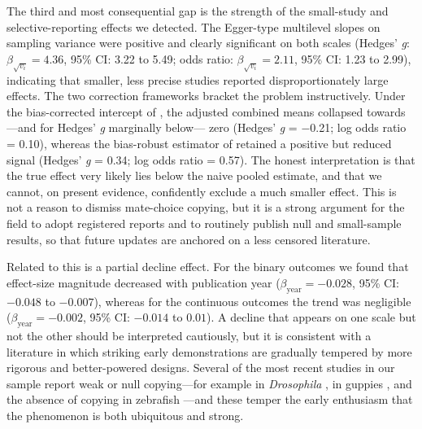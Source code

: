 The third and most consequential gap is the strength of the small-study and
selective-reporting effects we detected. The Egger-type multilevel slopes on
sampling variance were positive and clearly significant on both scales
(Hedges' \textit{g}: $\beta_{\sqrt{v_i}} = 4.36$, 95\% CI: 3.22 to 5.49; odds
ratio: $\beta_{\sqrt{v_i}} = 2.11$, 95\% CI: 1.23 to 2.99), indicating that
smaller, less precise studies reported disproportionately large effects. The two
correction frameworks bracket the problem instructively. Under the bias-corrected
intercept of \textcite{nakagawaMethodsTestingPublication2022}, the adjusted
combined means collapsed towards---and for Hedges' \textit{g} marginally below---
zero (Hedges' \textit{g} = $-$0.21; log odds ratio = 0.10), whereas the
bias-robust estimator of \textcite{yangRobustPointVariance2024} retained a
positive but reduced signal (Hedges' \textit{g} = 0.34; log odds ratio = 0.57).
The honest interpretation is that the true effect very likely lies below the
naive pooled estimate, and that we cannot, on present evidence, confidently
exclude a much smaller effect. This is not a reason to dismiss mate-choice
copying, but it is a strong argument for the field to adopt registered reports
and to routinely publish null and small-sample results, so that future updates
are anchored on a less censored literature.

Related to this is a partial decline effect. For the binary outcomes we found
that effect-size magnitude decreased with publication year
($\beta_{\mathrm{year}} = -0.028$, 95\% CI: $-0.048$ to $-0.007$), whereas for the
continuous outcomes the trend was negligible ($\beta_{\mathrm{year}} = -0.002$,
95\% CI: $-0.014$ to $0.01$). A decline that appears on one scale but not the
other should be interpreted cautiously, but it is consistent with a literature
in which striking early demonstrations are gradually tempered by more rigorous
and better-powered designs. Several of the most recent studies in our sample
report weak or null copying---for example in \textit{Drosophila}
\parencite{belkinaMateChoiceCopying2021,cirinoRobustMatePreferences2023}, in
guppies \parencite{pusiakRelativeSexualAttractiveness2020}, and the absence of
copying in zebrafish \parencite{nobelNoEvidenceMate2023}---and these temper the
early enthusiasm that the phenomenon is both ubiquitous and strong.

